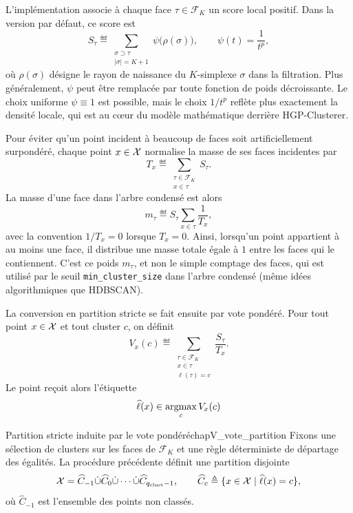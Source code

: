 L'implémentation associe à chaque face $\tau\in\mathcal F_K$ un score local positif. Dans la version par défaut, ce score est
\[
    S_\tau
    \eqdef
    \sum_{\substack{\sigma\supset\tau\\ |\sigma|=K+1}}
        \psi\bigl(\rho(\sigma)\bigr),
    \qquad
    \psi(t)=\frac{1}{t^p},
\]
où $\rho(\sigma)$ désigne le rayon de naissance du $K$-simplexe $\sigma$ dans la filtration. Plus généralement, $\psi$ peut être remplacée par toute fonction de poids décroissante. Le choix uniforme $\psi\equiv1$ est possible, mais le choix $1/t^p$ reflète plus exactement la densité locale, qui est au cœur du modèle mathématique derrière HGP-Clusterer.

Pour éviter qu'un point incident à beaucoup de faces soit artificiellement surpondéré, chaque point $x\in\mathcal{X}$ normalise la masse de ses faces incidentes par
\[
    T_x
    \eqdef
    \sum_{\substack{\tau\in\mathcal F_K\\ x\in\tau}} S_\tau.
\]
La masse d'une face dans l'arbre condensé est alors
\[
    m_\tau
    \eqdef
    S_\tau
    \sum_{x\in\tau}\frac1{T_x},
\]
avec la convention $1/T_x=0$ lorsque $T_x=0$. Ainsi, lorsqu'un point appartient à au moins une face, il distribue une masse totale égale à $1$ entre les faces qui le contiennent. C'est ce poids $m_\tau$, et non le simple comptage des faces, qui est utilisé par le seuil \texttt{min\_cluster\_size} dans l'arbre condensé (même idées algorithmiques que HDBSCAN).

La conversion en partition stricte se fait ensuite par vote pondéré. Pour tout point $x\in\mathcal{X}$ et tout cluster $c$, on définit
\[
    V_x(c)
    \eqdef
    \sum_{\substack{\tau\in\mathcal F_K\\ x\in\tau\\ \ell(\tau)=c}}
        \frac{S_\tau}{T_x}.
\]
Le point reçoit alors l'étiquette
\[
    \widehat\ell(x)
    \in
    \mathop{\mathrm{argmax }}_c V_x(c)
\]

\begin{Fait}{Partition stricte induite par le vote pondéré}{chapV_vote_partition}
Fixons une sélection de clusters sur les faces de $\mathcal F_K$ et une règle déterministe de départage des égalités. La procédure précédente définit une partition disjointe
\[
    \mathcal{X}
    =
    \widehat C_{-1} \dot \cup \widehat C_0 \dot \cup  \cdots \dot \cup  \widehat C_{q_\mathrm{clust}-1},
    \qquad
    \widehat C_c\triangleq\{x\in\mathcal{X}\mid \widehat\ell(x)=c\},
\]
où $\widehat C_{-1}$ est l'ensemble des points non classés. %
\end{Fait}

